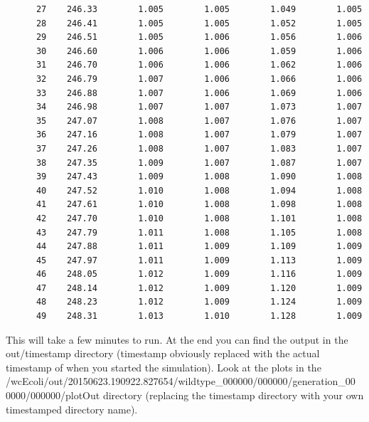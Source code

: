 \documentclass[12pt]{article}
\begin{document}
\begin{lstlisting}
      27    246.33        1.005        1.005        1.049        1.005
      28    246.41        1.005        1.005        1.052        1.005
      29    246.51        1.005        1.006        1.056        1.006
      30    246.60        1.006        1.006        1.059        1.006
      31    246.70        1.006        1.006        1.062        1.006
      32    246.79        1.007        1.006        1.066        1.006
      33    246.88        1.007        1.006        1.069        1.006
      34    246.98        1.007        1.007        1.073        1.007
      35    247.07        1.008        1.007        1.076        1.007
      36    247.16        1.008        1.007        1.079        1.007
      37    247.26        1.008        1.007        1.083        1.007
      38    247.35        1.009        1.007        1.087        1.007
      39    247.43        1.009        1.008        1.090        1.008
      40    247.52        1.010        1.008        1.094        1.008
      41    247.61        1.010        1.008        1.098        1.008
      42    247.70        1.010        1.008        1.101        1.008
      43    247.79        1.011        1.008        1.105        1.008
      44    247.88        1.011        1.009        1.109        1.009
      45    247.97        1.011        1.009        1.113        1.009
      46    248.05        1.012        1.009        1.116        1.009
      47    248.14        1.012        1.009        1.120        1.009
      48    248.23        1.012        1.009        1.124        1.009
      49    248.31        1.013        1.010        1.128        1.009
\end{lstlisting}

\hfill \break
\hfill \break

This will take a few minutes to run. At the end you can find the output in the out/timestamp directory (timestamp obviously replaced with the actual timestamp of when you started the simulation). Look at the plots in the /wcEcoli/out/20150623.190922.827654/wildtype\_000000/000000/generation\_00
0000/000000/plotOut directory (replacing the timestamp directory with your own timestamped directory name).
\end{document}
